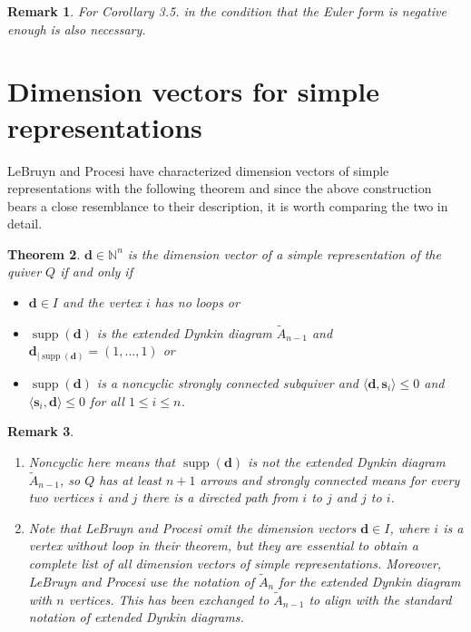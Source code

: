\documentclass{article}
\newcommand{\bs}{\mathbf{s}}
\newcommand{\bd}{\mathbf{d}}
\DeclareMathOperator{\supp}{supp}
\newtheorem{theorem}{Theorem}[section]
\newtheorem{remark}[theorem]{Remark}
\begin{document}
\begin{remark}
    For Corollary 3.5. in \cite{motivenullcone} the condition that the Euler form is negative enough is also necessary.  
\end{remark}

\section{Dimension vectors for simple representations}
LeBruyn and Procesi \cite{simplerepresentation} have characterized dimension vectors of simple representations with the following theorem and since the above construction bears a close resemblance to their description, it is worth comparing the two in detail.

\begin{theorem}
$\bd \in \mathbb{N}^n$ is the dimension vector of a simple representation of the
quiver $Q$ if and only if 
\begin{itemize}
    \item $\bd \in I$ and the vertex $i$ has no loops or
    \item $\supp(\bd)$ is the extended Dynkin diagram $\tilde{A}_{n-1}$ and $\bd_{|\supp(\bd)} = (1, ... , 1)$  or
    \item $\supp(\bd)$ is a noncyclic strongly connected subquiver and $\langle \bd, \bs_i \rangle \leq 0$ and $\langle \bs_i, \bd \rangle \leq 0$ for all $1 \leq i \leq n$.
\end{itemize}
\end{theorem}

 \begin{remark}
 \begin{enumerate}
     \item Noncyclic here means that $\supp(\bd)$ is not the extended Dynkin diagram $\tilde{A}_{n-1}$, so $Q$ has at least $n+1$ arrows and strongly connected means for every two vertices $i$ and $j$ there is a directed path from $i$ to $j$ and $j$ to $i$.
     \item Note that LeBruyn and Procesi \cite{simplerepresentation} omit the dimension vectors $\bd \in I$, where $i$ is a vertex without loop in their theorem,  but they are essential to obtain a complete list of all dimension vectors of simple representations. Moreover, LeBruyn and Procesi use the notation of $\tilde{A}_n$ for the extended Dynkin diagram with $n$ vertices. This has been exchanged to $\tilde{A}_{n-1}$ to align with the standard notation of extended Dynkin diagrams.  
 \end{enumerate}
 \end{remark}
\end{document}
